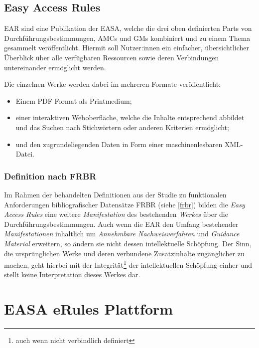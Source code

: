         \subsection{Easy Access Rules}

\acf{EAR} sind eine Publikation der \ac{EASA}, welche die drei oben definierten Parts von Durchführungsbestimmungen, \acp{AMC} und \acp{GM} kombiniert und zu einem Thema gesammelt veröffentlicht.
Hiermit soll Nutzer:innen ein einfacher, übersichtlicher Überblick über alle verfügbaren Ressourcen sowie deren Verbindungen untereinander ermöglicht werden.

\medskip
\noindent
    Die einzelnen Werke werden dabei im mehreren Formate veröffentlicht:
    \begin{itemize}
        \item Einem PDF Format als Printmedium;
        \item einer interaktiven Weboberfläche, welche die Inhalte entsprechend abbildet und das Suchen nach Stichwörtern oder anderen Kriterien ermöglicht;
        \item  und den zugrundeliegenden Daten in Form einer maschinenlesbaren XML-Datei. \cite{easa_xml_export}
    \end{itemize}



\subsubsection{Definition nach FRBR}

    Im Rahmen der behandelten Definitionen aus der Studie zu funktionalen Anforderungen bibliografischer Datensätze \acs{FRBR} (siehe \ref{frbr}) bilden die \textit{Easy Access Rules} eine weitere \textit{Manifestation} des bestehenden \textit{Werkes} über die Durchführungsbestimmungen.
    Auch wenn die \ac{EAR} den Umfang bestehender \textit{Manifestationen} inhaltlich um \textit{Annehmbare Nachweisverfahren} und \textit{Guidance Material} erweitern, so ändern sie nicht dessen intellektuelle Schöpfung.
    Der Sinn, die ursprünglichen Werke und deren verbundene Zusatzinhalte zugänglicher zu machen, geht hierbei mit der Integrität\footnote{auch wenn nicht verbindlich definiert} der intellektuellen Schöpfung einher und stellt keine Interpretation dieses Werkes dar.

        \pagebreak
    \section{EASA eRules Plattform}

